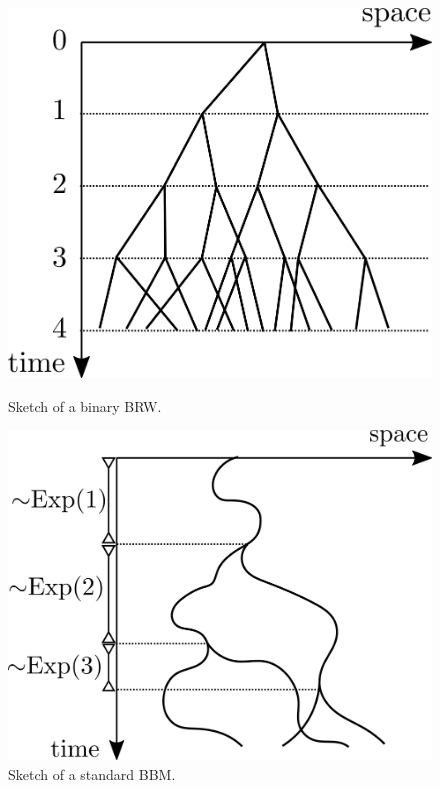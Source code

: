 \begin{figure}[!h]
\centering
\begin{minipage}{0.45\textwidth}
  \centering
  \includegraphics{graphics/binary_BRW}
  \caption{Sketch of a binary BRW. }
  \label{fig:binary_BRW}
\end{minipage}\hfill%
\begin{minipage}{0.45\textwidth}
  \centering
  \includegraphics{graphics/binary_BBM}
  \caption{Sketch of a standard BBM. }
  \label{fig:binary_BBM}
\end{minipage}
\end{figure}

